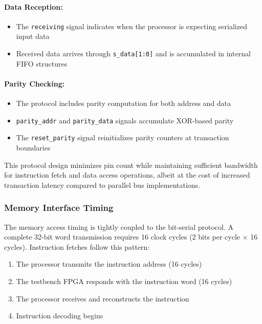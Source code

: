 \documentclass[12pt]{article}
\begin{document}
\paragraph{Data Reception:}
\begin{itemize}
    \item The \texttt{receiving} signal indicates when the processor is expecting serialized input data
    \item Received data arrives through \texttt{s\_data[1:0]} and is accumulated in internal FIFO structures
\end{itemize}

\paragraph{Parity Checking:}
\begin{itemize}
    \item The protocol includes parity computation for both address and data
    \item \texttt{parity\_addr} and \texttt{parity\_data} signals accumulate XOR-based parity
    \item The \texttt{reset\_parity} signal reinitializes parity counters at transaction boundaries
\end{itemize}

This protocol design minimizes pin count while maintaining sufficient bandwidth for instruction fetch and data access operations, albeit at the cost of increased transaction latency compared to parallel bus implementations.

\subsubsection{Memory Interface Timing}

The memory access timing is tightly coupled to the bit-serial protocol. A complete 32-bit word transmission requires 16 clock cycles (2 bits per cycle $\times$ 16 cycles). Instruction fetches follow this pattern:

\begin{enumerate}
    \item The processor transmits the instruction address (16 cycles)
    \item The testbench FPGA responds with the instruction word (16 cycles)
    \item The processor receives and reconstructs the instruction
    \item Instruction decoding begins
\end{enumerate}
\end{document}
